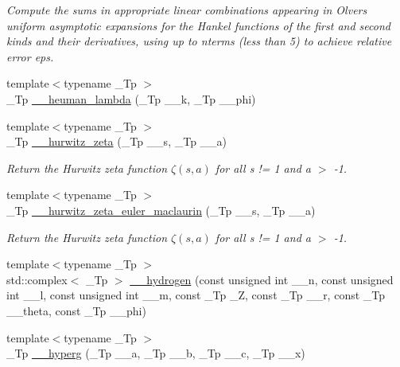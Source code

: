 \begin{DoxyCompactItemize}
\begin{DoxyCompactList}\small\item\em Compute the sums in appropriate linear combinations appearing in Olver\textquotesingle{}s uniform asymptotic expansions for the Hankel functions of the first and second kinds and their derivatives, using up to nterms (less than 5) to achieve relative error {\ttfamily eps}. \end{DoxyCompactList}\item 
{\footnotesize template$<$typename \+\_\+\+Tp $>$ }\\\+\_\+\+Tp \hyperlink{namespacestd_1_1____detail_a90938823a16cabc06031ebf209066a94}{\+\_\+\+\_\+heuman\+\_\+lambda} (\+\_\+\+Tp \+\_\+\+\_\+k, \+\_\+\+Tp \+\_\+\+\_\+phi)
\item 
{\footnotesize template$<$typename \+\_\+\+Tp $>$ }\\\+\_\+\+Tp \hyperlink{namespacestd_1_1____detail_a63aafed798ada71b2cc58e84a6652169}{\+\_\+\+\_\+hurwitz\+\_\+zeta} (\+\_\+\+Tp \+\_\+\+\_\+s, \+\_\+\+Tp \+\_\+\+\_\+a)
\begin{DoxyCompactList}\small\item\em Return the Hurwitz zeta function $ \zeta(s,a) $ for all s != 1 and a $>$ -\/1. \end{DoxyCompactList}\item 
{\footnotesize template$<$typename \+\_\+\+Tp $>$ }\\\+\_\+\+Tp \hyperlink{namespacestd_1_1____detail_a56c55858723fe9e0c541f0e77572b58d}{\+\_\+\+\_\+hurwitz\+\_\+zeta\+\_\+euler\+\_\+maclaurin} (\+\_\+\+Tp \+\_\+\+\_\+s, \+\_\+\+Tp \+\_\+\+\_\+a)
\begin{DoxyCompactList}\small\item\em Return the Hurwitz zeta function $ \zeta(s,a) $ for all s != 1 and a $>$ -\/1. \end{DoxyCompactList}\item 
{\footnotesize template$<$typename \+\_\+\+Tp $>$ }\\std\+::complex$<$ \+\_\+\+Tp $>$ \hyperlink{namespacestd_1_1____detail_af8bd1ad6980e19dce3ee9eb518bc90fa}{\+\_\+\+\_\+hydrogen} (const unsigned int \+\_\+\+\_\+n, const unsigned int \+\_\+\+\_\+l, const unsigned int \+\_\+\+\_\+m, const \+\_\+\+Tp \+\_\+\+Z, const \+\_\+\+Tp \+\_\+\+\_\+r, const \+\_\+\+Tp \+\_\+\+\_\+theta, const \+\_\+\+Tp \+\_\+\+\_\+phi)
\item 
{\footnotesize template$<$typename \+\_\+\+Tp $>$ }\\\+\_\+\+Tp \hyperlink{namespacestd_1_1____detail_a316589a60d5e5f50201c2d42b980678c}{\+\_\+\+\_\+hyperg} (\+\_\+\+Tp \+\_\+\+\_\+a, \+\_\+\+Tp \+\_\+\+\_\+b, \+\_\+\+Tp \+\_\+\+\_\+c, \+\_\+\+Tp \+\_\+\+\_\+x)

\end{DoxyCompactItemize}
